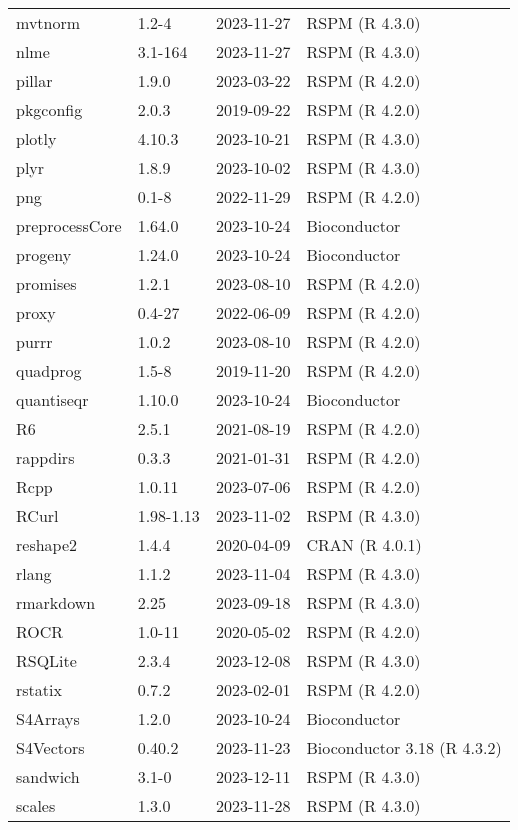 \begin{tabular}{llll}
\addlinespace
mvtnorm & 1.2-4 & 2023-11-27 & RSPM (R 4.3.0)\\
nlme & 3.1-164 & 2023-11-27 & RSPM (R 4.3.0)\\
pillar & 1.9.0 & 2023-03-22 & RSPM (R 4.2.0)\\
pkgconfig & 2.0.3 & 2019-09-22 & RSPM (R 4.2.0)\\
plotly & 4.10.3 & 2023-10-21 & RSPM (R 4.3.0)\\
\addlinespace
plyr & 1.8.9 & 2023-10-02 & RSPM (R 4.3.0)\\
png & 0.1-8 & 2022-11-29 & RSPM (R 4.2.0)\\
preprocessCore & 1.64.0 & 2023-10-24 & Bioconductor\\
progeny & 1.24.0 & 2023-10-24 & Bioconductor\\
promises & 1.2.1 & 2023-08-10 & RSPM (R 4.2.0)\\
\addlinespace
proxy & 0.4-27 & 2022-06-09 & RSPM (R 4.2.0)\\
purrr & 1.0.2 & 2023-08-10 & RSPM (R 4.2.0)\\
quadprog & 1.5-8 & 2019-11-20 & RSPM (R 4.2.0)\\
quantiseqr & 1.10.0 & 2023-10-24 & Bioconductor\\
R6 & 2.5.1 & 2021-08-19 & RSPM (R 4.2.0)\\
\addlinespace
rappdirs & 0.3.3 & 2021-01-31 & RSPM (R 4.2.0)\\
Rcpp & 1.0.11 & 2023-07-06 & RSPM (R 4.2.0)\\
RCurl & 1.98-1.13 & 2023-11-02 & RSPM (R 4.3.0)\\
reshape2 & 1.4.4 & 2020-04-09 & CRAN (R 4.0.1)\\
rlang & 1.1.2 & 2023-11-04 & RSPM (R 4.3.0)\\
\addlinespace
rmarkdown & 2.25 & 2023-09-18 & RSPM (R 4.3.0)\\
ROCR & 1.0-11 & 2020-05-02 & RSPM (R 4.2.0)\\
RSQLite & 2.3.4 & 2023-12-08 & RSPM (R 4.3.0)\\
rstatix & 0.7.2 & 2023-02-01 & RSPM (R 4.2.0)\\
S4Arrays & 1.2.0 & 2023-10-24 & Bioconductor\\
\addlinespace
S4Vectors & 0.40.2 & 2023-11-23 & Bioconductor 3.18 (R 4.3.2)\\
sandwich & 3.1-0 & 2023-12-11 & RSPM (R 4.3.0)\\
scales & 1.3.0 & 2023-11-28 & RSPM (R 4.3.0)\\

\end{tabular}
